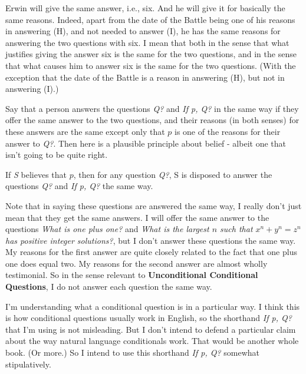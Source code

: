\documentclass[11pt,]{book}
\providecommand{\tightlist}{%
  \setlength{\itemsep}{0pt}\setlength{\parskip}{0pt}}
\begin{document}
Erwin will give the same answer, i.e., six. And he will give it for basically the same reasons. Indeed, apart from the date of the Battle being one of his reasons in answering (H), and not needed to answer (I), he has the same reasons for answering the two questions with six. I mean that both in the sense that what justifies giving the answer six is the same for the two questions, and in the sense that what causes him to answer six is the same for the two questions. (With the exception that the date of the Battle is a reason in answering (H), but not in answering (I).)

Say that a person answers the questions \emph{Q?} and \emph{If p, Q?} in the same way if they offer the same answer to the two questions, and their reasons (in both senses) for these answers are the same except only that \(p\) is one of the reasons for their answer to \emph{Q?}. Then here is a plausible principle about belief - albeit one that isn't going to be quite right.

\begin{description}
\tightlist
\item[Unrestricted Conditional Questions]
If \emph{S} believes that \(p\), then for any question \emph{Q?}, S is disposed to answer the questions \emph{Q?} and \emph{If p, Q?} the same way.
\end{description}

Note that in saying these questions are answered the same way, I really don't just mean that they get the same answers. I will offer the same answer to the questions \emph{What is one plus one?} and \emph{What is the largest \(n\) such that \(x^n + y^n = z^n\) has positive integer solutions?}, but I don't answer these questions the same way. My reasons for the first answer are quite closely related to the fact that one plus one does equal two. My reasons for the second answer are almost wholly testimonial. So in the sense relevant to \textbf{Unconditional Conditional Questions}, I do not answer each question the same way.

I'm understanding what a conditional question is in a particular way. I think this is how conditional questions usually work in English, so the shorthand \emph{If p, Q?} that I'm using is not misleading. But I don't intend to defend a particular claim about the way natural language conditionals work. That would be another whole book. (Or more.) So I intend to use this shorthand \emph{If p, Q?} somewhat stipulatively.
\end{document}
